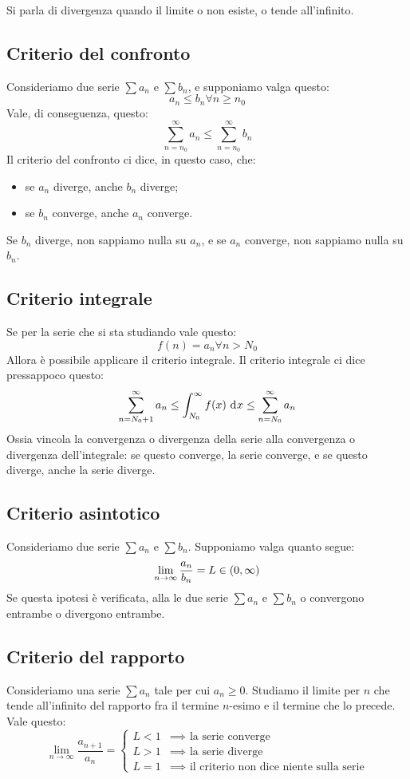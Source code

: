 Si parla di divergenza quando il limite o non esiste, o tende all'infinito.

\subsection{Criterio del confronto}

Consideriamo due serie $\sum a_n$ e $\sum b_n$, e supponiamo valga questo:
\[
a_n \le b_n \forall n \ge n_0
\]
Vale, di conseguenza, questo:
\[
\sum_{n = n_0}^{\infty} a_n \le \sum_{n = n_0}^{\infty} b_n
\]
Il criterio del confronto ci dice, in questo caso, che:
\begin{itemize}
    \item se $a_n$ diverge, anche $b_n$ diverge;
    \item se $b_n$ converge, anche $a_n$ converge.
\end{itemize}
Se $b_n$ diverge, non sappiamo nulla su $a_n$, e se $a_n$ converge, non 
sappiamo nulla su $b_n$.

\subsection{Criterio integrale}

Se per la serie che si sta studiando vale questo:
\[
f(n) = a_n \forall n > N_0
\]
Allora \`e possibile applicare il criterio integrale. Il criterio integrale
ci dice pressappoco questo:
\[
\sum_{n = N_0 + 1}^{\infty} a_n \le \int_{N_0}^{\infty} f(x) \dx 
\le \sum_{n = N_0}^{\infty} a_n
\]
Ossia vincola la convergenza o divergenza della serie alla convergenza o 
divergenza dell'integrale: se questo converge, la serie converge, e se
questo diverge, anche la serie diverge.

\subsection{Criterio asintotico}

Consideriamo due serie $\sum a_n$ e $\sum b_n$. Supponiamo valga quanto
segue:
\[
\lim_{n \to \infty} \frac{a_n}{b_n} = L \in \left( {0}, {\infty} \right)
\]
Se questa ipotesi \`e verificata, alla le due serie $\sum a_n$ e $\sum b_n$ 
o convergono entrambe o divergono entrambe.

\subsection{Criterio del rapporto}

Consideriamo una serie $\sum a_n$ tale per cui $a_n \ge 0$. Studiamo il 
limite per $n$ che tende all'infinito del rapporto fra il termine $n$-esimo
e il termine che lo precede. Vale questo:
\[
\lim_{n \to \infty} \frac{a_{n+1}}{a_n} =
\begin{cases}
L < 1 &\implies \text{ la serie converge} \\
L > 1 &\implies \text{ la serie diverge} \\
L = 1 &\implies \text{ il criterio non dice niente sulla serie}
\end{cases}
\]

